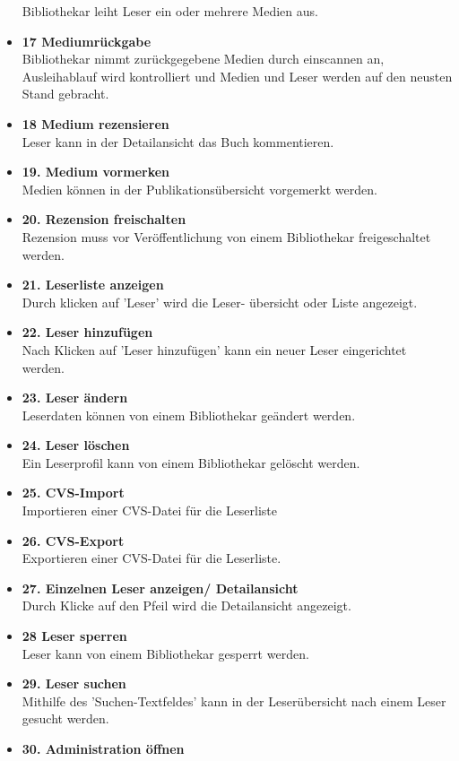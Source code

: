\documentclass[fontsize=12pt,paper=a4,twoside]{scrartcl}
\begin{document}
\begin{itemize}
	Bibliothekar leiht Leser ein oder mehrere Medien aus. 
	\item \textbf{17 Mediumrückgabe}\\
	Bibliothekar nimmt zurückgegebene Medien durch einscannen an, Ausleihablauf wird kontrolliert und Medien und Leser werden auf den neusten Stand gebracht. 
	\item \textbf{18 Medium rezensieren}\\
	Leser kann in der Detailansicht das Buch kommentieren. 
	\item \textbf{19. Medium vormerken}\\
	Medien können in der Publikationsübersicht vorgemerkt werden. 
	\item \textbf{20. Rezension freischalten}\\
	Rezension muss vor Veröffentlichung von einem Bibliothekar freigeschaltet werden. 
	\item \textbf{21. Leserliste anzeigen}\\
	Durch klicken auf 'Leser' wird die Leser- übersicht oder Liste angezeigt. 
	\item \textbf{22. Leser hinzufügen}\\
	Nach Klicken auf 'Leser hinzufügen' kann ein neuer Leser eingerichtet werden. 
	\item \textbf{23. Leser ändern}\\
	Leserdaten können von einem Bibliothekar geändert werden. 
	\item \textbf{24. Leser löschen}\\
	Ein Leserprofil kann von einem Bibliothekar gelöscht werden. 
	\item \textbf{25. CVS-Import}\\
	Importieren einer CVS-Datei für die Leserliste 
	\item \textbf{26. CVS-Export}\\
	Exportieren einer CVS-Datei für die Leserliste. 
	\item \textbf{27. Einzelnen Leser anzeigen/ Detailansicht}\\
	Durch Klicke auf den Pfeil wird die Detailansicht angezeigt. 
	\item \textbf{28 Leser sperren}\\
	Leser kann von einem Bibliothekar gesperrt werden. 
	\item \textbf{29. Leser suchen}\\
	Mithilfe des 'Suchen-Textfeldes' kann in der Leserübersicht nach einem Leser gesucht werden. 
	\item \textbf{30. Administration öffnen}\\

\end{itemize}
\end{document}
